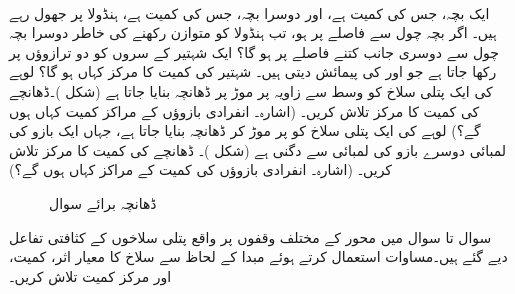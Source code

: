 
\\
ایک بچہ، جس کی کمیت   ہے، اور دوسرا بچہ، جس کی کمیت  ہے، ہنڈولا پر جھول رہے ہیں۔ اگر    بچہ چول سے  فاصلے پر ہو، تب ہنڈولا کو متوازن رکھنے کی خاطر دوسرا بچہ چول سے دوسری جانب کتنے فاصلے پر ہو گا؟
ایک شہتیر کے سروں کو دو  ترازوؤں پر رکھا جاتا ہے  جو  اور  کی پیمائش دیتی  ہیں۔ شہتیر کی کمیت کا مرکز کہاں ہو گا؟
لوہے کی ایک پتلی سلاخ کو وسط سے  زاویہ پر موڑ پر ڈھانچہ بنایا جاتا ہے (شکل )۔ڈھانچے  کی کمیت کا مرکز تلاش کریں۔ (اشارہ۔ انفرادی  بازوؤں   کے مراکز کمیت کہاں ہوں گے؟)
لوہے کی ایک پتلی سلاخ کو  پر موڑ کر ڈھانچہ  بنایا جاتا ہے، جہاں ایک بازو کی لمبائی دوسرے بازو کی لمبائی سے دگنی ہے (شکل )۔ ڈھانچے کی کمیت کا مرکز تلاش کریں۔ (اشارہ۔ انفرادی بازوؤں کی کمیت کے مراکز کہاں ہوں گے؟) 
\begin{figure}
\centering
\begin{minipage}{0.45\textwidth}
\centering
{}
\caption{لوہے کا  ڈھانچہ برائے سوال }
\label{شکل_سوال_تکمل_استعمال_سلاخ_مڑا_الف}
\end{minipage}\hfill
\begin{minipage}{0.45\textwidth}
\centering
{}
\caption{ڈھانچہ برائے سوال }
\label{شکل_سوال_تکمل_استعمال_سلاخ_مڑا_ب}
\end{minipage}
\end{figure}
سوال  تا سوال  میں محور  کے مختلف وقفوں پر  واقع پتلی سلاخوں کے  کثافتی تفاعل دیے گئے ہیں۔مساوات  استعمال کرتے ہوئے مبدا کے لحاظ سے سلاخ کا معیار اثر، کمیت،  اور مرکز کمیت تلاش کریں۔

